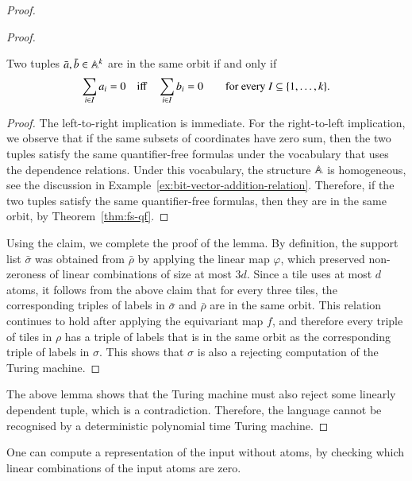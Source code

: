 \begin{proof}
\begin{proof}
	\begin{claim}
		Two tuples $\bar a, \bar b \in \mathbb A^k$ are in the same orbit if and only if
		\begin{align*}
		\sum_{i \in I} a_i = 0 \quad \text{iff} \quad \sum_{i \in I} b_i = 0  \qquad \text{for every $I \subseteq \{1,\ldots,k\}$}.
		\end{align*}
	\end{claim}
	\begin{proof}
		The left-to-right implication is immediate. For the right-to-left implication, we observe that if the same subsets of coordinates have zero sum, then the two tuples satisfy the same quantifier-free formulas under the vocabulary that uses the dependence relations. Under this vocabulary, the structure $\mathbb A$ is homogeneous, see the discussion in Example~\ref{ex:bit-vector-addition-relation}. Therefore, if the two tuples satisfy the same quantifier-free formulas, then they are in the same orbit, by Theorem~\ref{thm:fs-qf}. 	\end{proof}
		Using the claim, we complete the proof of the lemma. By definition, the support list $\bar \sigma$ was obtained from $\bar \rho$ by applying the linear map $\varphi$, which preserved non-zeroness of linear combinations of size at most $3d$. Since a tile uses at most $d$ atoms, it follows from the above claim that  for every three tiles, the corresponding triples of labels in $\bar \sigma$ and $\bar \rho$ are in the same orbit. This relation continues to hold after applying the equivariant map $f$, and therefore every triple of tiles in $\rho$ has a triple of labels that is in the same orbit as the corresponding triple of labels in $\sigma$. This shows that $\sigma$ is also a rejecting computation of the Turing machine.
\end{proof}
The above lemma shows that the Turing machine must also reject some linearly dependent tuple, which is a contradiction. Therefore, the language cannot be recognised by a deterministic polynomial time Turing machine.	
\end{proof}


	
\exercisepart

{
	One can compute a representation of the input without atoms, by checking which linear combinations of the input atoms are zero. 
}
	
